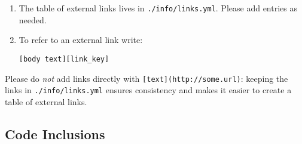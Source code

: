 \documentclass{scrbook}
\begin{document}
\begin{enumerate}

\item 

The table of external links lives in \texttt{./info/links.yml}.
    Please add entries as needed.



\item 

To refer to an external link write:

\begin{lstlisting}[frame=single,frameround=tttt]
[body text][link_key]
\end{lstlisting}



\end{enumerate}


Please do \emph{not} add links directly with \texttt{[text](http://some.url)}:
keeping the links in \texttt{./info/links.yml} ensures consistency
and makes it easier to create a table of external links.

\subsection*{Code Inclusions}
\end{document}
